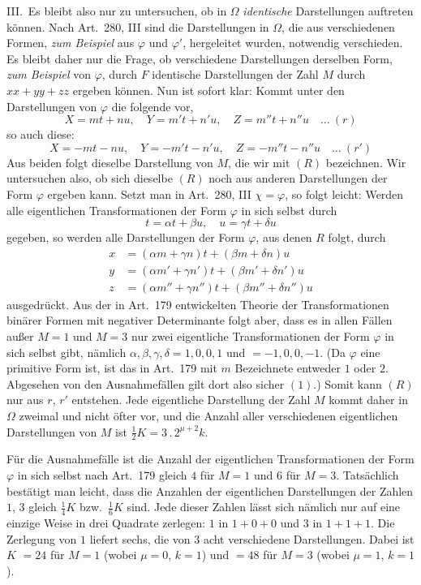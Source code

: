 III.\ Es bleibt also nur zu untersuchen, ob in $\Omega$ \textit{identische}
Darstellungen auftreten können. Nach Art.\ 280, III sind die Darstellungen
in $\Omega$, die aus verschiedenen Formen, \textit{zum Beispiel}
aus $\varphi$ und $\varphi'$, hergeleitet wurden, notwendig
verschieden. Es bleibt daher nur die Frage, ob verschiedene Darstellungen
derselben Form, \textit{zum Beispiel} von $\varphi$, durch $F$
identische Darstellungen der Zahl $M$ durch $xx+yy+zz$ ergeben
können. Nun ist sofort klar: Kommt unter den Darstellungen von $\varphi$
die folgende vor,
\[
X=mt+nu,\quad Y=m't+n'u,\quad Z=m''t+n''u\quad\ldots\ (r)
\]
so auch diese:
\[
X=-mt-nu,\quad Y=-m't-n'u,\quad Z=-m''t-n''u\quad\ldots\ (r')
\]
Aus beiden folgt dieselbe Darstellung von $M$, die wir mit
$(R)$ bezeichnen. Wir untersuchen also, ob sich dieselbe $(R)$
noch aus anderen Darstellungen der Form $\varphi$ ergeben kann.
Setzt man in Art.\ 280, III $\chi=\varphi$, so folgt leicht: Werden alle
eigentlichen Transformationen der Form $\varphi$ in sich selbst durch
\[
t=\alpha t+\beta u,\quad u=\gamma t+\delta u
\]
gegeben, so werden alle Darstellungen der Form $\varphi$, aus denen
$R$ folgt, durch
\[
\begin{aligned}
x&=(\alpha m+\gamma n)t+(\beta m+\delta n)u\\
y&=(\alpha m'+\gamma n')t+(\beta m'+\delta n')u\\
z&=(\alpha m''+\gamma n'')t+(\beta m''+\delta n'')u
\end{aligned}
\]
ausgedrückt. Aus der in Art.\ 179 entwickelten Theorie der Transformationen
binärer Formen mit negativer Determinante folgt aber, dass es in
allen Fällen außer $M=1$ und $M=3$ nur zwei eigentliche Transformationen
der Form $\varphi$ in sich selbst gibt, nämlich $\alpha,\allowbreak \beta,\allowbreak \gamma,\allowbreak \delta=1,\allowbreak 0,\allowbreak 0,\allowbreak 1$ und $=-1,0,0,-1$.
(Da $\varphi$ eine primitive Form ist, ist das in Art.\ 179 mit
$m$ Bezeichnete entweder $1$ oder $2$. Abgesehen von
den Ausnahmefällen gilt dort also sicher $(1)$.) Somit kann
$(R)$ nur aus $r$, $r'$ entstehen. Jede eigentliche
Darstellung der Zahl $M$ kommt daher in $\Omega$ zweimal und
nicht öfter vor, und die Anzahl aller verschiedenen eigentlichen
Darstellungen von $M$ ist $\tfrac{1}{2}K=3\,\allowbreak  .\,\allowbreak  2^{\mu+2}k$.

Für die Ausnahmefälle ist die Anzahl der eigentlichen Transformationen
der Form $\varphi$ in sich selbst nach Art.\ 179 gleich $4$
für $M=1$ und $6$ für $M=3$. Tatsächlich bestätigt man
leicht, dass die Anzahlen der eigentlichen Darstellungen der Zahlen
$1$, $3$ gleich $\tfrac{1}{4}K$ bzw.\ $\tfrac{1}{6}K$ sind. Jede dieser
Zahlen lässt sich nämlich nur auf eine einzige Weise in drei
Quadrate zerlegen: $1$ in $1+0+0$ und $3$ in $1+1+1$.
Die Zerlegung von $1$ liefert sechs, die von $3$ acht
verschiedene Darstellungen. Dabei ist $K$ $=24$
für $M=1$ (wobei $\mu=0$, $k=1$) und $=48$ für
$M=3$ (wobei $\mu=1$, $k=1$).

